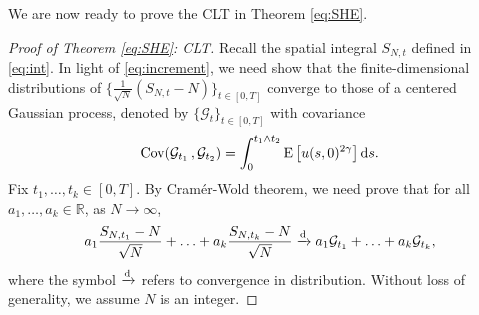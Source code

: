 \documentclass[12pt, reqno]{amsart}
\newcommand{\R}{{\mathbb{R}}}
\newcommand{\E}{\mathrm{E}}
\renewcommand{\d}{\mathrm{d}}
\newcommand{\<}{\langle}
\renewcommand{\>}{\rangle}
\DeclareMathOperator{\Cov}{\text{\rm Cov}}
\begin{document}
We are now ready to prove the CLT in Theorem \ref{eq:SHE}.

\begin{proof}[Proof of Theorem \ref{eq:SHE}: CLT]
           Recall the spatial integral $S_{N,t}$ defined in \eqref{eq:int}.
           In light of \eqref{eq:increment}, we need show that the finite-dimensional distributions of 
           $\{\frac1{\sqrt{N}}(S_{N,t}-N)\}_{t\in [0, T]}$ converge to those of a centered Gaussian process, denoted by $\{\mathcal{G}_t\}_{t\in [0, T]}$
           with covariance 
           \begin{align*}
             \Cov(\mathcal{G}_{t_1}\,, \mathcal{G}_{t_2}) = \int_0^{t_1\wedge t_2} \E\left[u(s,0)^{2\gamma}\right] \d s.
           \end{align*}
           Fix $t_1, \ldots, t_k\in [0, T]$.  By Cram\'er-Wold theorem, we need prove that for all $a_1, \ldots, a_k\in \R$, 
           as $N\to\infty$,
           \begin{align}\label{eq:fdd}
           a_1 \frac{S_{N,t_1}-N}{\sqrt{N}}+ \ldots + a_k \frac{{S_{N,t_k}-N}}{\sqrt{N}}\xrightarrow{\rm d} a_1\mathcal{G}_{t_1}+
           \ldots + a_k\mathcal{G}_{t_k},
           \end{align}
           where the symbol $\xrightarrow{\rm d}$ refers to convergence in distribution. 
           Without loss of generality, we assume $N$ is an integer.
           

\end{proof}
\end{document}

